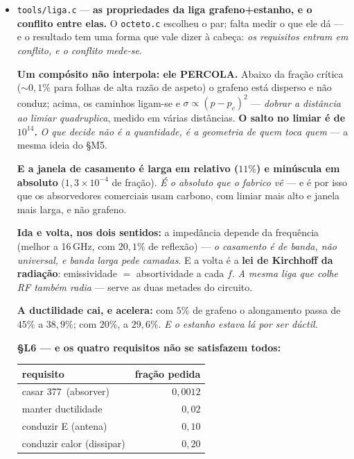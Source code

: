 \documentclass[11pt]{article}
\newcommand{\code}[1]{\texttt{\small #1}}
\theoremstyle{plain}
\theoremstyle{remark}
\begin{document}
\begin{itemize}
\textbf{A emenda do Aarão a meio (``ou grafeno + estanho'') é melhor}, por três razões medidas: o
estanho \emph{fecha} o octeto ($4+4=8$) e o bronze não é elemento; é condutor sem ser nobre; e é o
\emph{único metal comum com alotropia como a do carbono} --- o estanho branco é metálico e o cinzento
é semicondutor. \emph{Grafeno e estanho são os dois elementos deste medidor que mudam de canto por
rotação estrutural.} \textbf{14 unidades, resíduo 0.}


\item \code{tools/liga.c} --- \textbf{as propriedades da liga grafeno+estanho, e o conflito entre
elas.} O \code{octeto.c} escolheu o par; falta medir o que ele dá --- e o resultado tem uma forma que
vale dizer à cabeça: \emph{os requisitos entram em conflito, e o conflito mede-se}.

\textbf{Um compósito não interpola: ele PERCOLA.} Abaixo da fração crítica ($\sim0{,}1\%$ para
folhas de alta razão de aspeto) o grafeno está disperso e não conduz; acima, os caminhos ligam-se e
$\sigma \propto (p-p_c)^2$ --- \emph{dobrar a distância ao limiar quadruplica}, medido em várias
distâncias. \textbf{O salto no limiar é de $10^{14}$.} \emph{O que decide não é a quantidade, é a
geometria de quem toca quem} --- a mesma ideia do §M5.

\textbf{E a janela de casamento é larga em relativo ($11\%$) e minúscula em absoluto}
($1{,}3\times10^{-4}$ de fração). \emph{É o absoluto que o fabrico vê} --- e é por isso que os
absorvedores comerciais usam carbono, com limiar mais alto e janela mais larga, e não grafeno.

\textbf{Ida e volta, nos dois sentidos:} a impedância depende da frequência (melhor a 16\,GHz, com
$20{,}1\%$ de reflexão) --- \emph{o casamento é de banda, não universal, e banda larga pede camadas}.
E a volta é a \textbf{lei de Kirchhoff da radiação}: emissividade $=$ absortividade a cada $f$.
\emph{A mesma liga que colhe RF também radia} --- serve as duas metades do circuito.

\textbf{A ductilidade cai, e acelera:} com $5\%$ de grafeno o alongamento passa de $45\%$ a $38{,}9\%$;
com $20\%$, a $29{,}6\%$. \emph{E o estanho estava lá por ser dúctil.}

\textbf{§L6 --- e os quatro requisitos não se satisfazem todos:}

\begin{center}
\begin{tabular}{lr}
\toprule
requisito & fração pedida \\
\midrule
casar 377\,\textohm{} (absorver) & $0{,}0012$ \\
manter ductilidade & $0{,}02$ \\
conduzir E (antena) & $0{,}10$ \\
conduzir calor (dissipar) & $0{,}20$ \\
\bottomrule
\end{tabular}
\end{center}


\end{itemize}
\end{document}
